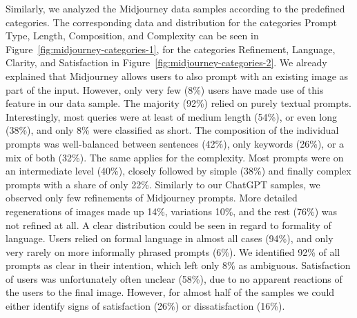 Similarly, we analyzed the Midjourney data samples according to the predefined categories.
The corresponding data and distribution for the categories Prompt Type, Length, Composition, and
Complexity can be seen in Figure~\ref{fig:midjourney-categories-1}, for the categories Refinement, Language, Clarity, and Satisfaction in Figure~\ref{fig:midjourney-categories-2}.
We already explained that Midjourney allows users to also prompt with an existing image as part of
the input.
However, only very few (8\%) users have made use of this feature in our data sample.
The majority (92\%) relied on purely textual prompts.
Interestingly, most queries were at least of medium length (54\%), or even long (38\%), and only 8\%
were classified as short.
The composition of the individual prompts was well-balanced between sentences (42\%), only keywords
(26\%), or a mix of both (32\%).
The same applies for the complexity.
Most prompts were on an intermediate level (40\%), closely followed by simple (38\%) and finally
complex prompts with a share of only 22\%.
Similarly to our ChatGPT samples, we observed only few refinements of Midjourney prompts.
More detailed regenerations of images made up 14\%, variations 10\%, and the rest (76\%) was not
refined
at all.
A clear distribution could be seen in regard to formality of language.
Users relied on formal language in almost all cases (94\%), and only very rarely on more informally
phrased prompts (6\%).
We identified 92\% of all prompts as clear in their intention, which left only 8\% as ambiguous.
Satisfaction of users was unfortunately often unclear (58\%), due to no apparent reactions of the
users to the final image.
However, for almost half of the samples we could either identify signs of satisfaction (26\%) or
dissatisfaction (16\%).

